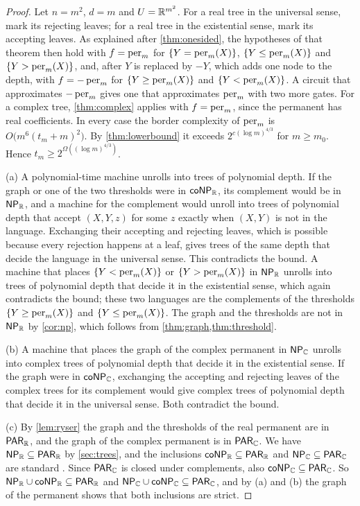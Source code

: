\begin{proof}
Let $n=m^2$, $d=m$ and $U=\mathbb{R}^{m^2}$. For a real tree in the universal sense, mark its rejecting leaves; for a real tree in the existential sense, mark its accepting leaves. As explained after \cref{thm:onesided}, the hypotheses of that theorem then hold with $f=\operatorname{per}_m$ for $\{Y=\operatorname{per}_m(X)\}$, $\{Y\le\operatorname{per}_m(X)\}$ and $\{Y>\operatorname{per}_m(X)\}$, and, after $Y$ is replaced by $-Y$, which adds one node to the depth, with $f=-\operatorname{per}_m$ for $\{Y\ge\operatorname{per}_m(X)\}$ and $\{Y<\operatorname{per}_m(X)\}$. A circuit that approximates $-\operatorname{per}_m$ gives one that approximates $\operatorname{per}_m$ with two more gates. For a complex tree, \cref{thm:complex} applies with $f=\operatorname{per}_m$, since the permanent has real coefficients. In every case the border complexity of $\operatorname{per}_m$ is $O\bigl(m^6(t_m+m)^2\bigr)$. By \cref{thm:lowerbound} it exceeds $2^{c(\log m)^{4/3}}$ for $m\ge m_0$. Hence $t_m\ge2^{\Omega((\log m)^{4/3})}$.

(a) A polynomial-time machine unrolls into trees of polynomial depth. If the graph or one of the two thresholds were in $\textsf{\upshape coNP}_{\mathbb{R}}$, its complement would be in $\textsf{\upshape NP}_{\mathbb{R}}$, and a machine for the complement would unroll into trees of polynomial depth that accept $(X,Y,z)$ for some $z$ exactly when $(X,Y)$ is not in the language. Exchanging their accepting and rejecting leaves, which is possible because every rejection happens at a leaf, gives trees of the same depth that decide the language in the universal sense. This contradicts the bound. A machine that places $\{Y<\operatorname{per}_m(X)\}$ or $\{Y>\operatorname{per}_m(X)\}$ in $\textsf{\upshape NP}_{\mathbb{R}}$ unrolls into trees of polynomial depth that decide it in the existential sense, which again contradicts the bound; these two languages are the complements of the thresholds $\{Y\ge\operatorname{per}_m(X)\}$ and $\{Y\le\operatorname{per}_m(X)\}$. The graph and the thresholds are not in $\textsf{\upshape NP}_{\mathbb{R}}$ by \cref{cor:np}, which follows from \cref{thm:graph,thm:threshold}.

(b) A machine that places the graph of the complex permanent in $\textsf{\upshape NP}_{\mathbb{C}}$ unrolls into complex trees of polynomial depth that decide it in the existential sense. If the graph were in $\textsf{\upshape coNP}_{\mathbb{C}}$, exchanging the accepting and rejecting leaves of the complex trees for its complement would give complex trees of polynomial depth that decide it in the universal sense. Both contradict the bound.

(c) By \cref{lem:ryser} the graph and the thresholds of the real permanent are in $\textsf{\upshape PAR}_{\mathbb{R}}$, and the graph of the complex permanent is in $\textsf{\upshape PAR}_{\mathbb{C}}$. We have $\textsf{\upshape NP}_{\mathbb{R}}\subseteq\textsf{\upshape PAR}_{\mathbb{R}}$ by \cref{sec:trees}, and the inclusions $\textsf{\upshape coNP}_{\mathbb{R}}\subseteq\textsf{\upshape PAR}_{\mathbb{R}}$ and $\textsf{\upshape NP}_{\mathbb{C}}\subseteq\textsf{\upshape PAR}_{\mathbb{C}}$ are standard \cite{BCSS98}. Since $\textsf{\upshape PAR}_{\mathbb{C}}$ is closed under complements, also $\textsf{\upshape coNP}_{\mathbb{C}}\subseteq\textsf{\upshape PAR}_{\mathbb{C}}$. So $\textsf{\upshape NP}_{\mathbb{R}}\cup\textsf{\upshape coNP}_{\mathbb{R}}\subseteq\textsf{\upshape PAR}_{\mathbb{R}}$ and $\textsf{\upshape NP}_{\mathbb{C}}\cup\textsf{\upshape coNP}_{\mathbb{C}}\subseteq\textsf{\upshape PAR}_{\mathbb{C}}$, and by (a) and (b) the graph of the permanent shows that both inclusions are strict.
\end{proof}
